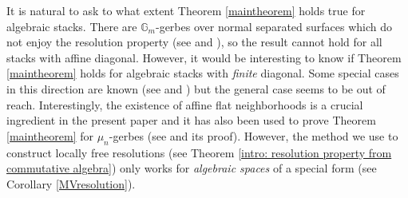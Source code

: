 \documentclass[12pt]{amsart}
\begin{document}
\begin{Remark} It is natural to ask to what extent Theorem \ref{maintheorem} holds true for algebraic stacks. There are $\mathbb{G}_m$-gerbes over normal separated surfaces which do not enjoy the resolution property (see \cite[Thm. 1.1]{TotaroRes} and \cite[Ex. 3.12]{EHKV}), so the result cannot hold for all stacks with affine diagonal. However, it would be interesting to know if Theorem \ref{maintheorem} holds for algebraic stacks with \emph{finite} diagonal. Some special cases in this direction are known (see \cite{SidRes} and \cite{KreschVistoli}) but the general case seems to be out of reach. Interestingly, the existence of affine flat neighborhoods is a crucial ingredient in the present paper and it has also been used to prove Theorem \ref{maintheorem} for $\mu_n$-gerbes (see \cite[Cor. 2]{mathur2020experiments} and its proof). However, the method we use to construct locally free resolutions (see Theorem \ref{intro: resolution property from commutative algebra}) only works for \emph{algebraic spaces} of a special form (see Corollary \ref{MVresolution}). \end{Remark}
\end{document}
